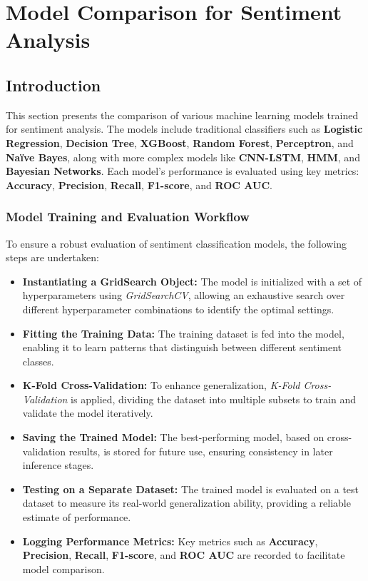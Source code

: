 \section{Model Comparison for Sentiment Analysis}

\subsection{Introduction}

This section presents the comparison of various machine learning models trained for sentiment analysis. The models include traditional classifiers such as \textbf{Logistic Regression}, \textbf{Decision Tree}, \textbf{XGBoost}, \textbf{Random Forest}, \textbf{Perceptron}, and \textbf{Naïve Bayes}, along with more complex models like \textbf{CNN-LSTM}, \textbf{HMM}, and \textbf{Bayesian Networks}. Each model's performance is evaluated using key metrics: \textbf{Accuracy}, \textbf{Precision}, \textbf{Recall}, \textbf{F1-score}, and \textbf{ROC AUC}.

\subsubsection{Model Training and Evaluation Workflow}

To ensure a robust evaluation of sentiment classification models, the following steps are undertaken:

\begin{itemize}
    \item \textbf{Instantiating a GridSearch Object:} The model is initialized with a set of hyperparameters using \textit{GridSearchCV}, allowing an exhaustive search over different hyperparameter combinations to identify the optimal settings.
    
    \item \textbf{Fitting the Training Data:} The training dataset is fed into the model, enabling it to learn patterns that distinguish between different sentiment classes.
    
    \item \textbf{K-Fold Cross-Validation:} To enhance generalization, \textit{K-Fold Cross-Validation} is applied, dividing the dataset into multiple subsets to train and validate the model iteratively.
    
    \item \textbf{Saving the Trained Model:} The best-performing model, based on cross-validation results, is stored for future use, ensuring consistency in later inference stages.
    
    \item \textbf{Testing on a Separate Dataset:} The trained model is evaluated on a test dataset to measure its real-world generalization ability, providing a reliable estimate of performance.
    
    \item \textbf{Logging Performance Metrics:} Key metrics such as \textbf{Accuracy}, \textbf{Precision}, \textbf{Recall}, \textbf{F1-score}, and \textbf{ROC AUC} are recorded to facilitate model comparison.
\end{itemize}


